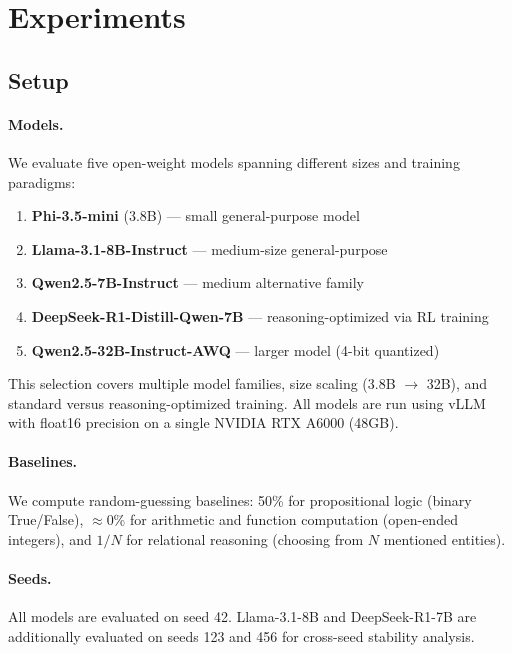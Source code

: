 \documentclass{article}
\begin{document}
\section{Experiments}
\label{sec:experiments}

\subsection{Setup}

\paragraph{Models.}
We evaluate five open-weight models spanning different sizes and training paradigms:
\begin{enumerate}
    \item \textbf{Phi-3.5-mini} (3.8B) --- small general-purpose model~\citep{abdin2024phi3}
    \item \textbf{Llama-3.1-8B-Instruct} --- medium-size general-purpose~\citep{grattafiori2024llama3}
    \item \textbf{Qwen2.5-7B-Instruct} --- medium alternative family~\citep{yang2024qwen25}
    \item \textbf{DeepSeek-R1-Distill-Qwen-7B} --- reasoning-optimized via RL training~\citep{guo2025deepseek}
    \item \textbf{Qwen2.5-32B-Instruct-AWQ} --- larger model (4-bit quantized)~\citep{yang2024qwen25}
\end{enumerate}

This selection covers multiple model families, size scaling (3.8B $\to$ 32B), and standard versus reasoning-optimized training. All models are run using vLLM~\citep{kwon2023vllm} with float16 precision on a single NVIDIA RTX A6000 (48GB).

\paragraph{Baselines.}
We compute random-guessing baselines: 50\% for propositional logic (binary True/False), $\approx$0\% for arithmetic and function computation (open-ended integers), and $1/N$ for relational reasoning (choosing from $N$ mentioned entities).

\paragraph{Seeds.}
All models are evaluated on seed 42. Llama-3.1-8B and DeepSeek-R1-7B are additionally evaluated on seeds 123 and 456 for cross-seed stability analysis.
\end{document}
